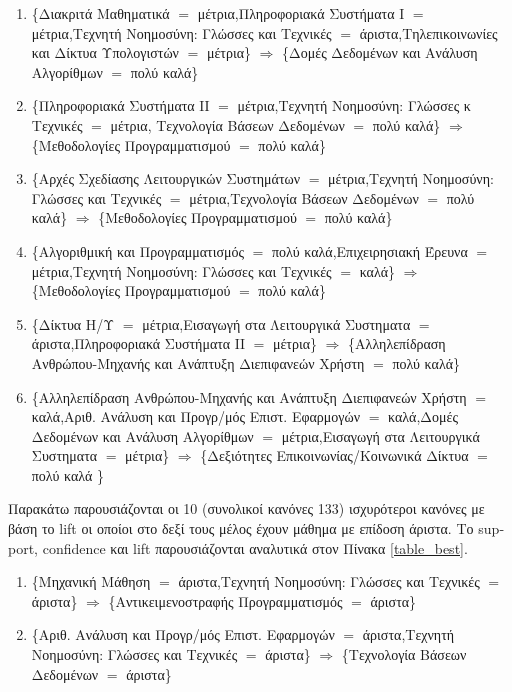 \documentclass[12pt,a4paper,final]{article}
\begin{document}
\begin{landscape}
\begin{enumerate}
\item \{Διακριτά Μαθηματικά $=$ μέτρια,Πληροφοριακά Συστήματα Ι $=$ μέτρια,Τεχνητή Νοημοσύνη: Γλώσσες και Τεχνικές $=$ άριστα,Τηλεπικοινωνίες και Δίκτυα Υπολογιστών $=$ μέτρια\} $\Rightarrow$ \{Δομές Δεδομένων και Ανάλυση Αλγορίθμων $=$ πολύ καλά\}


\item   \{Πληροφοριακά Συστήματα ΙΙ $=$ μέτρια,Τεχνητή Νοημοσύνη:   Γλώσσες κ Τεχνικές $=$ μέτρια, Τεχνολογία Βάσεων Δεδομένων $=$ πολύ καλά\} $\Rightarrow$ \{Μεθοδολογίες Προγραμματισμού $=$ πολύ καλά\}


\item \{Αρχές Σχεδίασης Λειτουργικών Συστημάτων $=$ μέτρια,Τεχνητή Νοημοσύνη: Γλώσσες και Τεχνικές  $=$ μέτρια,Τεχν\-ολογία Βάσεων Δεδομένων  $=$ πολύ καλά\} $\Rightarrow$ \{Μεθοδολογίες Προγραμματισμού  $=$ πολύ καλά\}


\item \{Αλγοριθμική και Προγραμματισμός $=$ πολύ καλά,Επιχειρησιακή Έρευνα $=$ μέτρια,Τεχνητή Νοημοσύνη: Γλώσσες και Τεχνικές $=$ καλά\} $\Rightarrow$ \{Μεθοδολογίες Προγραμματισμού $=$ πολύ καλά\}


\item \{Δίκτυα Η/Υ $=$ μέτρια,Εισαγωγή στα Λειτουργικά Συστηματα $=$ άριστα,Πληροφοριακά Συστήματα ΙΙ $=$ μέτρια\} $\Rightarrow$ \{Αλληλεπίδραση Ανθρώπου-Μηχανής και Ανάπτυξη Διεπιφανεών Χρήστη $=$ πολύ καλά\}

\item \{Αλληλεπίδραση Ανθρώπου-Μηχανής και Ανάπτυξη Διεπιφανεών Χρήστη $=$ καλά,Αριθ. Ανάλυση και Προγρ/μός Επιστ. Εφαρμογών $=$ καλά,Δομές Δεδομένων και Ανάλυση Αλγορίθμων $=$ μέτρια,Εισαγωγή στα Λειτουργικά Συστηματα $=$ μέτρια\} $\Rightarrow$ \{Δεξιότητες Επικοινωνίας/Κοινωνικά Δίκτυα $=$ πολύ καλά \}

\end{enumerate}
Παρακάτω παρουσιάζονται οι 10 (συνολικοί κανόνες 133) ισχυρότεροι κανόνες με βάση το \foreignlanguage{english}{lift} οι οποίοι στο δεξί τους μέλος έχουν μάθημα με επίδοση άριστα. Το \foreignlanguage{english}{support, confidence} και \foreignlanguage{english}{lift} παρουσιάζονται αναλυτικά στον Πίνακα \ref{table_best}.
\begin{enumerate}

\item \{Μηχανική Μάθηση $=$ άριστα,Τεχνητή Νοημοσύνη: Γλώσσες και Τεχνικές $=$ άριστα\} $\Rightarrow$ \{Αντικειμενοστραφής Προγραμματισμός $=$ άριστα\}
   

\item \{Αριθ. Ανάλυση και Προγρ/μός Επιστ. Εφαρμογών $=$ άριστα,Τεχνητή Νοημοσύνη: Γλώσσες και Τεχνικές $=$ άριστα\} $\Rightarrow$ \{Τεχνολογία Βάσεων Δεδομένων $=$ άριστα\}



\end{enumerate}
\end{landscape}
\end{document}
